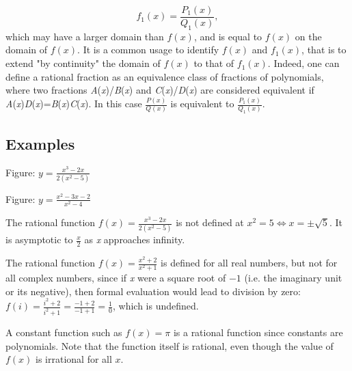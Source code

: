 $$f _1(x) = \frac{P _1(x)}{Q _1(x)},$$ which may have a larger domain than $f(x)$, and is
equal to $f(x)$ on the domain of $f(x).$ It is a common usage to identify $f(x)$ and $f
_1(x)$, that is to extend "by continuity" the domain of $f(x)$ to that of $f _1(x).$
Indeed, one can define a rational fraction as an equivalence class of fractions of
polynomials, where two fractions \textit{A}(\textit{x})/\textit{B}(\textit{x}) and
\textit{C}(\textit{x})/\textit{D}(\textit{x}) are considered equivalent if
\textit{A}(\textit{x})\textit{D}(\textit{x})=\textit{B}(\textit{x})\textit{C}(\textit{x}).
In this case $\frac{P(x)}{Q(x)}$ is equivalent to $\frac{P _1(x)}{Q _1(x)}$.




\subsection{Examples}
\label{sss:exam-bfeb}







Figure: $y = \frac{x^3-2x}{2(x^2-5)}$






Figure: $y = \frac{x^2-3x-2}{x^2-4}$



The rational function $f(x) = \frac{x^3-2x}{2(x^2-5)}$ is not defined at $x^2=5
\Leftrightarrow x=\pm \sqrt{5}$. It is asymptotic to $\frac{x}{2}$ as \textit{x}
approaches infinity.



The rational function $f(x) = \frac{x^2 + 2}{x^2 + 1}$ is defined for all real numbers,
but not for all complex numbers, since if \textit{x} were a square root of $-1$ (i.e. the
imaginary unit or its negative), then formal evaluation would lead to division by zero:
$f(i) = \frac{i^2 + 2}{i^2 + 1} = \frac{-1 + 2}{-1 + 1} = \frac{1}{0}$, which is
undefined.



A constant function such as $f(x) = \pi$ is a rational function since constants are
polynomials. Note that the function itself is rational, even though the value of $f(x)$ is irrational for all $x$.



